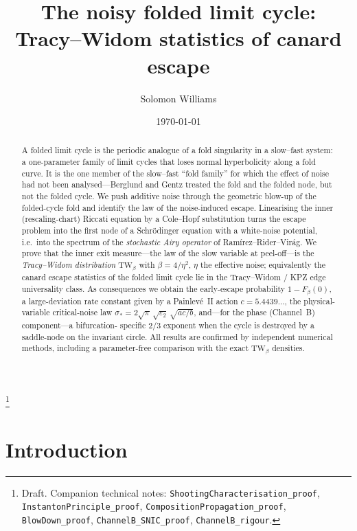 \documentclass[11pt,reqno]{amsart}
\theoremstyle{plain}
\theoremstyle{definition}
\theoremstyle{remark}
\newcommand{\TW}{\mathrm{TW}}
\newcommand{\ep}{\varepsilon}
\begin{document}
\title[Tracy--Widom statistics of canard escape]{The noisy folded limit cycle:\\
Tracy--Widom statistics of canard escape}
\author{Solomon Williams}
\address{School of Mathematics, University of Edinburgh}
\email{}
\thanks{Draft. Companion technical notes:
\texttt{ShootingCharacterisation\_proof}, \texttt{InstantonPrinciple\_proof},
\texttt{CompositionPropagation\_proof}, \texttt{BlowDown\_proof},
\texttt{ChannelB\_SNIC\_proof}, \texttt{ChannelB\_rigour}.}
\date{\today}

\begin{abstract}
A folded limit cycle is the periodic analogue of a fold singularity in a slow--fast
system: a one-parameter family of limit cycles that loses normal hyperbolicity along a
fold curve. It is the one member of the slow--fast ``fold family'' for which the effect of
noise had not been analysed---Berglund and Gentz treated the fold and the folded node, but
not the folded cycle. We push additive noise through the geometric blow-up of the
folded-cycle fold and identify the law of the noise-induced escape. Linearising the inner
(rescaling-chart) Riccati equation by a Cole--Hopf substitution turns the escape problem
into the first node of a Schr\"odinger equation with a white-noise potential, i.e.\ into
the spectrum of the \emph{stochastic Airy operator} of Ram\'irez--Rider--Vir\'ag. We prove
that the inner exit measure---the law of the slow variable at peel-off---is the
\emph{Tracy--Widom distribution} $\TW_\beta$ with $\beta=4/\eta^2$, $\eta$ the effective
noise; equivalently the canard escape statistics of the folded limit cycle lie in the
Tracy--Widom / KPZ edge universality class. As consequences we obtain the early-escape
probability $1-F_\beta(0)$, a large-deviation rate constant given by a Painlev\'e~II action
$c=5.4439\ldots$, the physical-variable critical-noise law $\sigma_*=2\sqrt\pi\,
\sqrt{\ep_2}\,\sqrt{ac/b}$, and---for the phase (Channel~B) component---a bifurcation-
specific $2/3$ exponent when the cycle is destroyed by a saddle-node on the invariant
circle. All results are confirmed by independent numerical methods, including a
parameter-free comparison with the exact $\TW_\beta$ densities.
\end{abstract}

\maketitle

\section{Introduction}
\end{document}
